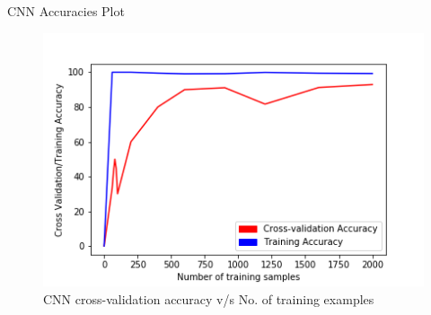 \documentclass[10pt, a4paper]{beamer}
\begin{document}
\begin{frame}{CNN Accuracies Plot}



\begin{figure}
 \includegraphics[height=0.6 \textheight]{sample_vs_accuracy.png}
 \caption{\scriptsize CNN cross-validation accuracy v/s No. of training examples}
\end{figure}

\end{frame}
\end{document}
